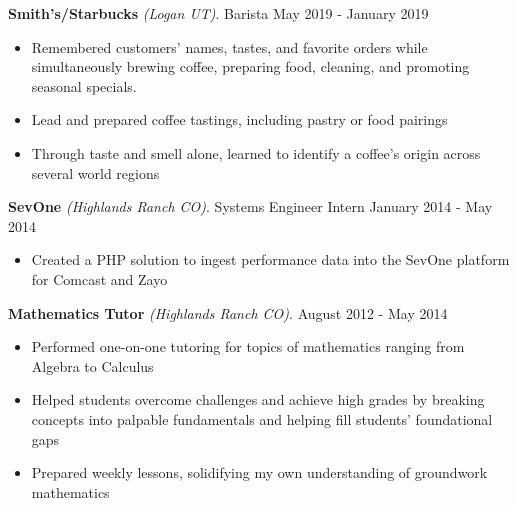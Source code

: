\documentclass[letterpaper,11pt]{article}
\begin{document}
\clearpage
\textbf{Smith's/Starbucks} \textit{(Logan UT)}. Barista \hfill May 2019 - January 2019
\begin{itemize}[noitemsep,topsep=0pt]
	\item Remembered customers' names, tastes, and favorite orders while simultaneously brewing coffee, preparing food, cleaning, and promoting seasonal specials.
	\item Lead and prepared coffee tastings, including pastry or food pairings
	\item Through taste and smell alone, learned to identify a coffee's origin across several world regions\\

\end{itemize}

\textbf{SevOne} \textit{(Highlands Ranch CO)}. Systems Engineer Intern \hfill January 2014 - May 2014
\begin{itemize}[noitemsep,topsep=0pt]
	\item Created a PHP solution to ingest performance data into the SevOne platform for Comcast and Zayo\\
\end{itemize}

\textbf{Mathematics Tutor} \textit{(Highlands Ranch CO)}. \hfill August 2012 - May 2014
\begin{itemize}[noitemsep,topsep=0pt]
	\item Performed one-on-one tutoring for topics of mathematics ranging from Algebra to Calculus
	\item Helped students overcome challenges and achieve high grades by breaking concepts into palpable fundamentals and helping fill students' foundational gaps
	\item Prepared weekly lessons, solidifying my own understanding of groundwork mathematics\\
\end{itemize}

\end{document}
